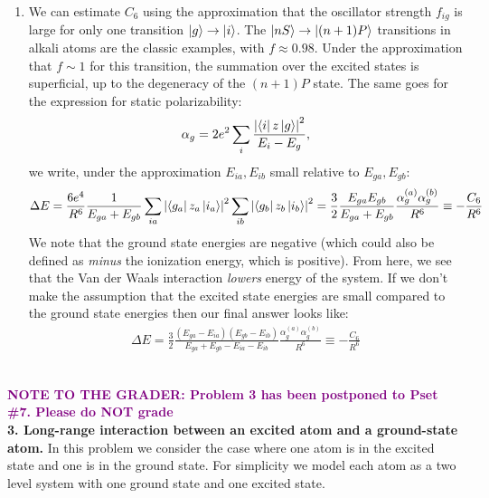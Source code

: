 \documentclass{article}
\theoremstyle{definition}
\newcommand{\al}{\alpha}
\newcommand{\f}[2]{\frac{#1}{#2}}
\begin{document}
\begin{enumerate}[label=(\alph*)]
\item We can estimate $C_6$ using the approximation that the oscillator strength $f_{ig}$ is large for only one transition $\ket{g} \to \ket{i}$. The $\ket{nS} \to \ket{(n+1)P}$ transitions in alkali atoms are the classic examples, with $f \approx 0.98$. Under the approximation that $f\sim 1$ for this transition, the summation over the excited states is superficial, up to the degeneracy of the $(n+1)P$ state. The same goes for the expression for  static polarizability:
\begin{align*}
\al_g = 2e^2 \sum_i \f{\abs{ \bra{i}z \ket{g} }^2}{E_i - E_g},
\end{align*}
we write, under the approximation $E_{ia}, E_{ib}$ small relative to $E_{ga}, E_{gb}$:
\begin{align*}
\Delta E 
= 
\f{ 6 e^4 }{R^6} \f{1}{E_{ga} + E_{gb}} 
\sum_{ia} \abs{ \bra{g_a} z_a \ket{i_a}}^2   \sum_{ib} \abs{ \bra{g_b} z_b \ket{i_b}}^2 
= \f{3}{2} \f{E_{ga}E_{gb}}{E_{ga} + E_{gb}} 
\f{\al_g^{(a)} \al_g^{(b)}}{R^6} \equiv -\f{C_6}{R^6}
\end{align*}
We note that the ground state energies are negative (which could also be defined as \textit{minus} the ionization energy, which is positive). From here, we see that the Van der Waals interaction \textit{lowers} energy of the system. If we don't make the assumption that the excited state energies are small compared to the ground state energies then our final answer looks like:
\begin{align*}
\Delta E = \f{3}{2} \f{(E_{ga} - E_{ia})(E_{gb} - E_{ib})}{E_{ga} + E_{gb} - E_{ia} - E_{ib}}   
\f{\al_g^{(a)} \al_g^{(b)}}{R^6} \equiv -\f{C_6}{R^6}
\end{align*}



\end{enumerate}


\,\, \\
\noindent \textbf{\textcolor{purple}{NOTE TO THE GRADER: Problem 3 has been postponed to Pset \#7. Please do NOT grade}}\\


\noindent \textbf{3. Long-range interaction between an excited atom and a ground-state atom.} In this problem we consider the case where one atom is in the excited state and one is in the ground state. For simplicity we model each atom as a two level system with one ground state and one excited state. 
\end{document}
